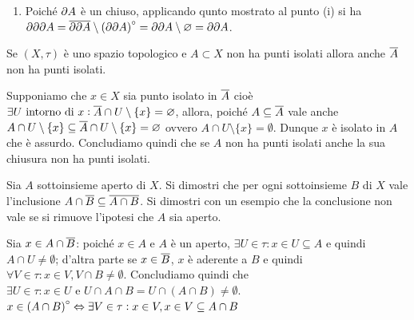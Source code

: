 \documentclass[a4paper]{article}\par \usepackage{style}\par
\begin{document}
\begin{enumerate}[label = (\roman*)]
\item Poiché $ \partial{A} $ è un chiuso, applicando qunto mostrato al punto (i) si ha $ \partial{\partial{\partial{A}}} = \overline{\partial{\partial{A}}} \setminus {(\partial{\partial{A}})}^{\circ} = \partial{\partial{A}} \setminus \varnothing = \partial{\partial{A}} $.
\end{enumerate}\par \begin{es}
  Se $ (X, \tau) $ è uno spazio topologico e $ A \subset X $ non ha punti isolati allora anche $ \overline{A} $ non ha punti isolati.
\end{es}\par Supponiamo che $ x \in X $ sia punto isolato in $ \overline{A} $ cioè $ \exists U \text{ intorno di } x : \overline{A} \cap U \setminus \{x\} = \varnothing $, allora, poiché $ A \subseteq \overline{A} $ vale anche $ A \cap U \setminus \{x\} \subseteq \overline{A} \cap U \setminus \{x\} = \varnothing $ ovvero $ A \cap U \setminus \{x\} = \emptyset $. Dunque $ x $ è isolato in $ A $ che è assurdo. Concludiamo quindi che se $ A $ non ha punti isolati anche la sua chiusura non ha punti isolati.\par \begin{es}
  Sia $ A $ sottoinsieme aperto di $ X $. Si dimostri che per ogni sottoinsieme $ B $ di $ X $ vale l'inclusione $ A \cap \overline{B} \subseteq \overline{A \cap B} $. Si dimostri con un esempio che la conclusione non vale se si rimuove l'ipotesi che $ A $ sia aperto.
\end{es}\par Sia $ x \in A \cap \overline{B} $: poiché $ x \in A $ e $ A $ è un aperto, $ \exists U \in \tau : x \in U \subseteq A $ e quindi $ A \cap U \neq \emptyset $; d'altra parte se $ x \in \overline{B} $, $ x $ è aderente a $ B $ e quindi $ \forall V \in \tau : x \in V, V \cap B \neq \emptyset $. Concludiamo quindi che $ \exists U \in \tau : x \in U \text{ e } U \cap A \cap B = U \cap (A \cap B) \neq \emptyset $. \\
$ x \in {(A \cap B)}^{\circ} \Leftrightarrow \exists V \in \tau : x \in V, x \in V \subseteq A \cap B $
\end{document}
